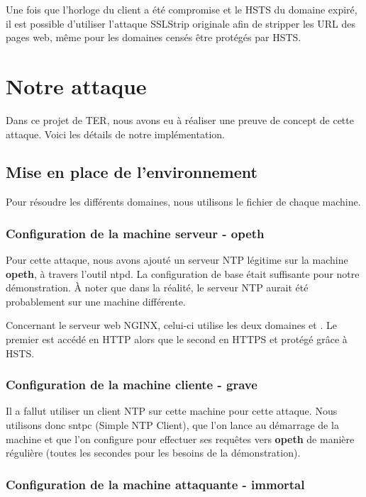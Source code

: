 Une fois que l'horloge du client a été compromise et le HSTS du domaine expiré, il est possible d'utiliser l'attaque SSLStrip originale afin de stripper les URL des pages web, même pour les domaines censés être protégés par HSTS.

\section{Notre attaque}

Dans ce projet de TER, nous avons eu à réaliser une preuve de concept de cette attaque. Voici les détails de notre implémentation.

\subsection{Mise en place de l'environnement}

Pour résoudre les différents domaines, nous utilisons le fichier  de chaque machine.

\subsubsection{Configuration de la machine serveur - opeth}

Pour cette attaque, nous avons ajouté un serveur NTP légitime sur la machine \textbf{opeth}, à travers l'outil ntpd. La configuration de base était suffisante pour notre démonstration. À noter que dans la réalité, le serveur NTP aurait été probablement sur une machine différente.

Concernant le serveur web NGINX, celui-ci utilise les deux domaines  et . Le premier est accédé en HTTP alors que le second en HTTPS et protégé grâce à HSTS.

\subsubsection{Configuration de la machine cliente - grave}

Il a fallut utiliser un client NTP sur cette machine pour cette attaque. Nous utilisons donc sntpc (Simple NTP Client), que l'on lance au démarrage de la machine et que l'on configure pour effectuer ses requêtes vers \textbf{opeth} de manière régulière (toutes les secondes pour les besoins de la démonstration).


\subsubsection{Configuration de la machine attaquante - immortal}

